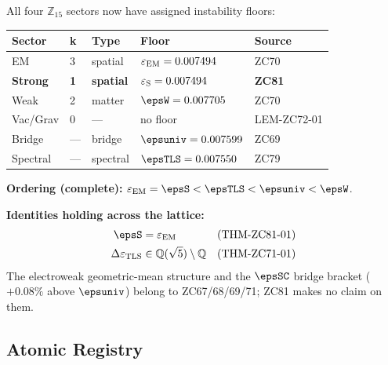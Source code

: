 \documentclass[12pt, a4paper]{article}
\renewcommand{\epsEM}{\varepsilon_{\rm EM}}
\begin{document}
\begin{keybox}[title={Complete $\varepsilon$ Floor Lattice
  (T-canonical, $R_0$)}]

All four $\mathbb{Z}_{15}$ sectors now have assigned instability floors:
\medskip

{\small\renewcommand{\arraystretch}{1.35}
\begin{center}
\begin{tabular}{@{}p{1.9cm}p{0.9cm}p{1.6cm}p{2.0cm}p{4.4cm}@{}}
\toprule
\textbf{Sector} & \textbf{k} & \textbf{Type} & \textbf{Floor} & \textbf{Source} \\
\midrule
EM        & 3 & spatial & $\epsEM = 0.007494$ & ZC70 \\
\textbf{Strong} & \textbf{1} & \textbf{spatial} & $\varepsilon_{\rm S} = 0.007494$ & \textbf{ZC81} \\
Weak      & 2 & matter  & $\epsW = 0.007705$ & ZC70 \\
Vac/Grav  & 0 & ---     & no floor           & LEM-ZC72-01 \\
\midrule
Bridge    & --- & bridge & $\epsuniv = 0.007599$ & ZC69 \\
Spectral  & --- & spectral & $\epsTLS = 0.007550$ & ZC79 \\
\bottomrule
\end{tabular}
\end{center}}

\medskip
\textbf{Ordering (complete):}
$\epsEM = \epsS < \epsTLS < \epsuniv < \epsW$.

\textbf{Identities holding across the lattice:}
\begin{align}
  \epsS &= \epsEM
    && \text{(THM-ZC81-01)} \label{eq:SEM} \\
  \Delta\varepsilon_{\rm TLS} &\in \mathbb{Q}(\sqrt{5})\setminus\mathbb{Q}
    && \text{(THM-ZC71-01)} \label{eq:field}
\end{align}
The electroweak geometric-mean structure and the $\epsSC$ bridge
bracket ($+0.08\%$ above $\epsuniv$) belong to ZC67/68/69/71; ZC81
makes no claim on them.
\end{keybox}

\subsection{Atomic Registry}
\label{sec:registry}
\end{document}
